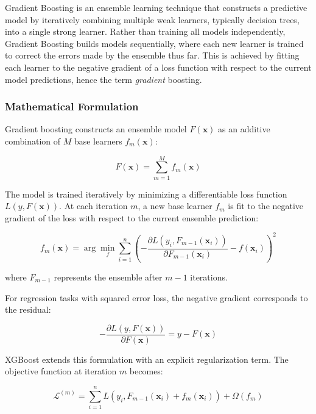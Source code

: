 Gradient Boosting is an ensemble learning technique that constructs a predictive model by iteratively combining multiple weak learners, typically decision trees, into a single strong learner. Rather than training all models independently, Gradient Boosting builds models sequentially, where each new learner is trained to correct the errors made by the ensemble thus far. This is achieved by fitting each learner to the negative gradient of a loss function with respect to the current model predictions, hence the term \emph{gradient} boosting.

\subsubsection{Mathematical Formulation}

Gradient boosting constructs an ensemble model $F(\mathbf{x})$ as an additive combination of $M$ base learners $f_m(\mathbf{x})$:

\begin{equation}
F(\mathbf{x}) = \sum_{m=1}^{M} f_m(\mathbf{x})
\end{equation}

The model is trained iteratively by minimizing a differentiable loss function $L(y, F(\mathbf{x}))$. At each iteration $m$, a new base learner $f_m$ is fit to the negative gradient of the loss with respect to the current ensemble prediction:

\begin{equation}
f_m(\mathbf{x}) = \arg\min_{f} \sum_{i=1}^{n} \left( -\frac{\partial L(y_i, F_{m-1}(\mathbf{x}_i))}{\partial F_{m-1}(\mathbf{x}_i)} - f(\mathbf{x}_i) \right)^2
\end{equation}

where $F_{m-1}$ represents the ensemble after $m-1$ iterations.

For regression tasks with squared error loss, the negative gradient corresponds to the residual:

\begin{equation}
-\frac{\partial L(y, F(\mathbf{x}))}{\partial F(\mathbf{x})} = y - F(\mathbf{x})
\end{equation}

XGBoost extends this formulation with an explicit regularization term. The objective function at iteration $m$ becomes:

\begin{equation}
\mathcal{L}^{(m)} = \sum_{i=1}^{n} L(y_i, F_{m-1}(\mathbf{x}_i) + f_m(\mathbf{x}_i)) + \Omega(f_m)
\end{equation}


